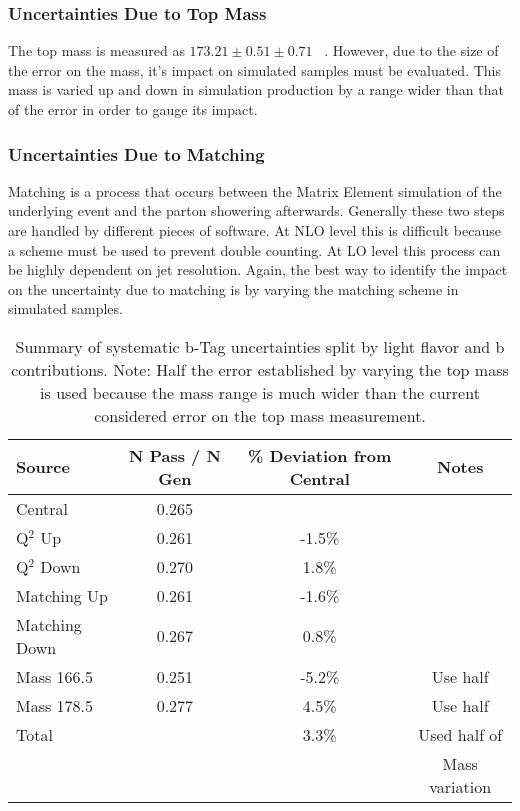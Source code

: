 \subsubsection{Uncertainties Due to Top Mass}
The top mass is measured as $173.21 \pm 0.51 \pm 0.71$ \GeV~\cite{pdg}. However, due to the size of the error on the mass, it's impact on simulated samples must be evaluated. This mass is varied up and down in simulation production by a range wider than that of the error in order to gauge its impact.\\


\subsubsection{Uncertainties Due to Matching}
Matching is a process that occurs between the Matrix Element simulation of the underlying event and the parton showering afterwards. Generally these two steps are handled by different pieces of software. At NLO level this is difficult because a scheme must be used to prevent double counting. At LO level this process can be highly dependent on jet resolution. Again, the best way to identify the impact on the uncertainty due to matching is by varying the matching scheme in simulated samples.\\


\begin{table}[h]
\begin{center}

\begin{tabular}{lccc}\hline
Source                  &  N Pass / N Gen & \% Deviation from Central & Notes\\ \hline
Central                 & 0.265 & & \\
Q$^2$ Up                 & 0.261 & -1.5\% & \\
Q$^2$ Down           & 0.270 & 1.8\% & \\
Matching Up       & 0.261 & -1.6\% & \\
Matching Down  & 0.267 & 0.8\% & \\
Mass 166.5         & 0.251 & -5.2\% & Use half \\
Mass 178.5         & 0.277 & 4.5\% & Use half \\
\hline
Total                     &             & 3.3\% & Used half of\\
                              &             &             & Mass variation \\
\hline
\end{tabular}
\caption{\label{tab:systupdown} Summary of systematic b-Tag uncertainties split by light flavor and b contributions. Note: Half the error established by varying the top mass is used because the mass range is much wider than the current considered error on the top mass measurement.}
\end{center}
\end{table}



